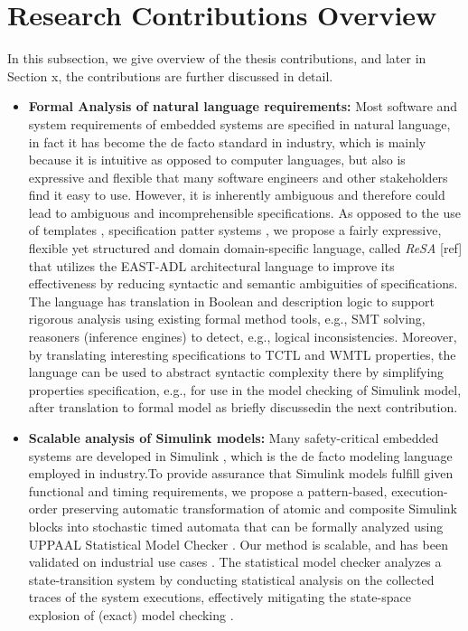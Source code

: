 \section{Research Contributions Overview}
In this subsection, we give overview of the thesis contributions, and later in Section x, the contributions are further discussed in detail.
\begin{itemize}
\item \textbf{Formal Analysis of natural language requirements: } Most software and system requirements of embedded systems are specified in natural language, in fact it has become the de facto standard in industry, which is mainly because it is intuitive as opposed to computer languages, but also is expressive and flexible that many software engineers and other stakeholders find it easy to use. However, it is inherently ambiguous and therefore could lead to ambiguous and incomprehensible specifications. 
As opposed to the use of templates \cite{Hull2011RequirementsEngineering}, specification patter systems\cite{Gruhn2006PatternsSpecifications,Konrad2005Real-timePatterns} , we propose a fairly expressive, flexible yet structured and domain domain-specific language, called \textit{ReSA} [ref] that utilizes the EAST-ADL architectural language to improve its effectiveness by reducing syntactic and semantic ambiguities of specifications. The language has translation in Boolean and description logic to support rigorous analysis using existing formal method tools, e.g., SMT solving, reasoners (inference engines) to detect, e.g., logical inconsistencies. Moreover, by translating interesting specifications to TCTL and WMTL properties, the language can be used to abstract syntactic complexity there by simplifying properties specification, e.g., for use in the model checking of Simulink model, after translation to formal model as briefly discussedin the next contribution.
\item \textbf{Scalable analysis of Simulink models: }
Many safety-critical embedded systems are developed in Simulink \cite{JamesB.Dabney2003MasteringSimulink}, which is the de facto modeling language employed in industry.To provide assurance that Simulink models fulfill given functional and timing requirements, we propose a pattern-based, execution-order preserving automatic transformation of atomic and composite Simulink blocks into stochastic timed automata that can be formally analyzed using UPPAAL Statistical Model Checker \cite{Bulychev2012UPPAAL-SMC:Automata}. Our method is scalable, and has been validated on industrial use cases \cite{Filipovikj2016SimulinkSystems}. The statistical model checker analyzes a state-transition system by conducting statistical analysis on the collected traces of the system executions, effectively mitigating the state-space explosion of (exact) model checking \cite{Legay2010StatisticalOverview}. 


\end{itemize}
